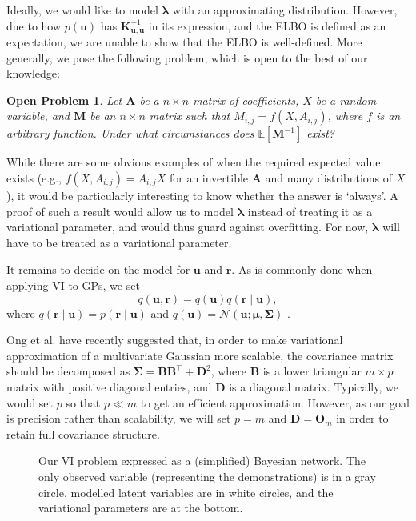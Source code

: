 \documentclass{mpaper}
\newtheorem{problem}[theorem]{Open Problem}
\newcommand{\Kuu}{\mathbf{K}_{\mathbf{u},\mathbf{u}}}
\newcommand{\approximation}{q(\mathbf{u}, \mathbf{r})}
\begin{document}
Ideally, we would like to model $\bm\lambda$ with an approximating distribution.
However, due to how $p(\mathbf{u})$ has $\Kuu^{-1}$ in its expression, and the
ELBO is defined as an expectation, we are unable to show that the ELBO is
well-defined. More generally, we pose the following problem, which is open to
the best of our knowledge:
\begin{problem}
  Let $\mathbf{A}$ be a $n \times n$ matrix of coefficients, $X$ be a random
  variable, and $\mathbf{M}$ be an $n \times n$ matrix such that $M_{i,j} = f(X,
  A_{i,j})$, where $f$ is an arbitrary function. Under what circumstances does
  $\mathbb{E}[\mathbf{M}^{-1}]$ exist?
\end{problem}
While there are some obvious examples of when the required expected value
exists (e.g., $f(X, A_{i,j}) = A_{i,j}X$ for an invertible $\mathbf{A}$ and many
distributions of $X$), it would be particularly interesting to know whether the
answer is `always'. A proof of such a result would allow us to model
$\bm\lambda$ instead of treating it as a variational parameter, and would thus
guard against overfitting. For now, $\bm\lambda$ will have to be treated as a
variational parameter.

It remains to decide on the model for $\mathbf{u}$ and $\mathbf{r}$. As is
commonly done when applying VI to GPs, we set
\begin{equation} \label{eq:approximation}
  \approximation = q(\mathbf{u}) q(\mathbf{r} \mid \mathbf{u}),
\end{equation}
where $q(\mathbf{r} \mid \mathbf{u}) = p(\mathbf{r} \mid \mathbf{u})$ and
$q(\mathbf{u}) = \mathcal{N}(\mathbf{u}; \bm\mu, \bm\Sigma)$
\cite{DBLP:conf/nips/ChengB17}.

Ong et al. \cite{ong2018gaussian} have recently suggested that, in order to make
variational approximation of a multivariate Gaussian more scalable, the
covariance matrix should be decomposed as $\bm\Sigma =
\mathbf{B}\mathbf{B}^\intercal + \mathbf{D}^2$, where $\mathbf{B}$ is a lower
triangular $m \times p$ matrix with positive diagonal entries, and $\mathbf{D}$
is a diagonal matrix. Typically, we would set $p$ so that $p \ll m$ to get an
efficient approximation. However, as our goal is precision rather than
scalability, we will set $p = m$ and $\mathbf{D} = \mathbf{O}_m$ in order to
retain full covariance structure.

\begin{figure}
  \centering
  \caption{Our VI problem expressed as a (simplified)
    Bayesian network. The only observed variable (representing the
    demonstrations) is in a gray circle, modelled latent variables are in white
    circles, and the variational parameters are at the bottom.}
  \label{fig:graphical_model}
\end{figure}
\end{document}
